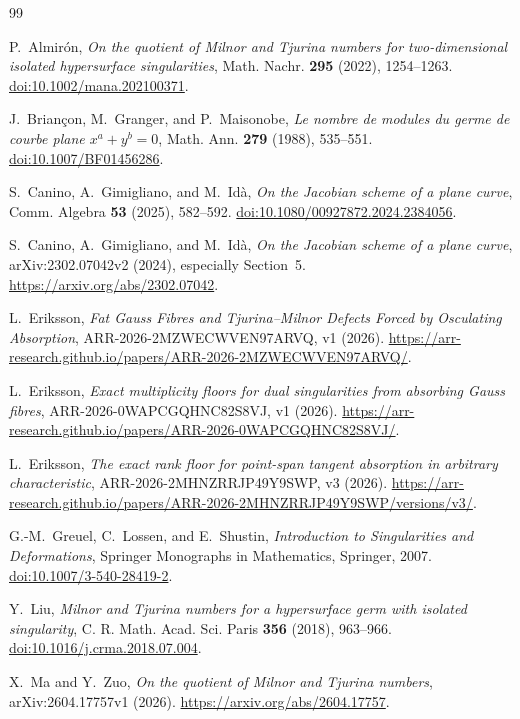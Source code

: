 \documentclass[11pt,a4paper]{article}
\theoremstyle{definition}
\numberwithin{equation}{section}
\begin{document}
\begin{thebibliography}{99}

P.~Almir\'on,
\emph{On the quotient of Milnor and Tjurina numbers for two-dimensional
isolated hypersurface singularities},
Math. Nachr. \textbf{295} (2022), 1254--1263.
\href{https://doi.org/10.1002/mana.202100371}{doi:10.1002/mana.202100371}.

J.~Brian\c{c}on, M.~Granger, and P.~Maisonobe,
\emph{Le nombre de modules du germe de courbe plane \(x^a+y^b=0\)},
Math. Ann. \textbf{279} (1988), 535--551.
\href{https://doi.org/10.1007/BF01456286}{doi:10.1007/BF01456286}.

S.~Canino, A.~Gimigliano, and M.~Id\`a,
\emph{On the Jacobian scheme of a plane curve},
Comm. Algebra \textbf{53} (2025), 582--592.
\href{https://doi.org/10.1080/00927872.2024.2384056}
{doi:10.1080/00927872.2024.2384056}.

S.~Canino, A.~Gimigliano, and M.~Id\`a,
\emph{On the Jacobian scheme of a plane curve}, arXiv:2302.07042v2 (2024),
especially Section~5.
\url{https://arxiv.org/abs/2302.07042}.

L.~Eriksson,
\emph{Fat Gauss Fibres and Tjurina--Milnor Defects Forced by Osculating
Absorption}, ARR-2026-2MZWECWVEN97ARVQ, v1 (2026).
\url{https://arr-research.github.io/papers/ARR-2026-2MZWECWVEN97ARVQ/}.

L.~Eriksson,
\emph{Exact multiplicity floors for dual singularities from absorbing Gauss
fibres}, ARR-2026-0WAPCGQHNC82S8VJ, v1 (2026).
\url{https://arr-research.github.io/papers/ARR-2026-0WAPCGQHNC82S8VJ/}.

L.~Eriksson,
\emph{The exact rank floor for point-span tangent absorption in arbitrary
characteristic}, ARR-2026-2MHNZRRJP49Y9SWP, v3 (2026).
\url{https://arr-research.github.io/papers/ARR-2026-2MHNZRRJP49Y9SWP/versions/v3/}.

G.-M.~Greuel, C.~Lossen, and E.~Shustin,
\emph{Introduction to Singularities and Deformations},
Springer Monographs in Mathematics, Springer, 2007.
\href{https://doi.org/10.1007/3-540-28419-2}{doi:10.1007/3-540-28419-2}.

Y.~Liu,
\emph{Milnor and Tjurina numbers for a hypersurface germ with isolated
singularity},
C. R. Math. Acad. Sci. Paris \textbf{356} (2018), 963--966.
\href{https://doi.org/10.1016/j.crma.2018.07.004}
{doi:10.1016/j.crma.2018.07.004}.

X.~Ma and Y.~Zuo,
\emph{On the quotient of Milnor and Tjurina numbers},
arXiv:2604.17757v1 (2026).
\url{https://arxiv.org/abs/2604.17757}.

\end{thebibliography}
\end{document}
